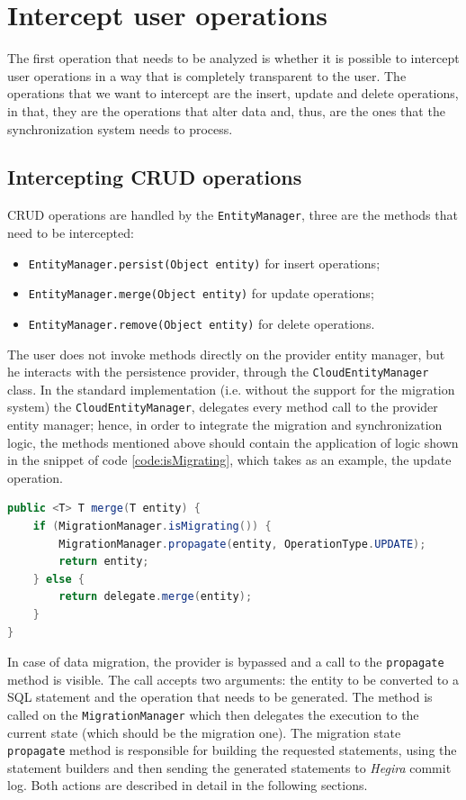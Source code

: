 \section{Intercept user operations}
The first operation that needs to be analyzed is whether it is possible to intercept user operations in a way that is completely transparent to the user.
The operations that we want to intercept are the insert, update and delete operations, in that, they are the operations that alter data and, thus, are the ones that the synchronization system needs to process.

\subsection{Intercepting CRUD operations}
CRUD operations are handled by the \texttt{EntityManager}, three are the methods that need to be intercepted:
\begin{itemize}
\item \texttt{EntityManager.persist(Object entity)} for insert operations;
\item \texttt{EntityManager.merge(Object entity)} for update operations;
\item \texttt{EntityManager.remove(Object entity)} for delete operations.
\end{itemize}
\noindent The user does not invoke methods directly on the provider entity manager, but he interacts with the persistence provider, through the \texttt{CloudEntityManager} class. In the standard implementation (i.e. without the support for the migration system) the \texttt{CloudEntityManager}, delegates every method call to the provider entity manager; hence, in order to integrate the  migration and synchronization logic, the methods mentioned above should contain the application of logic shown in the snippet of code \ref{code:isMigrating}, which takes as an example, the update operation.

\begin{lstlisting}[language=Java, caption=Integrate migration logic, label=code:isMigrating]
public <T> T merge(T entity) {
    if (MigrationManager.isMigrating()) {
        MigrationManager.propagate(entity, OperationType.UPDATE);
        return entity;
    } else {
        return delegate.merge(entity);
    }
}
\end{lstlisting}

\noindent In case of data migration, the provider is bypassed and a call to the \texttt{propagate} method is visible. The call accepts two arguments: the entity to be converted to a SQL statement and the operation that needs to be generated. The method is called on the \texttt{MigrationManager} which then delegates the execution to the current state (which should be the migration one). The migration state \texttt{propagate} method is responsible for building the requested statements, using the statement builders and then sending the generated statements to \textit{Hegira} commit log. Both actions are described in detail in the following sections.

